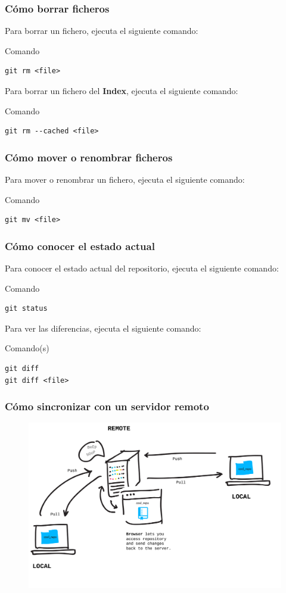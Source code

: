 \documentclass{beamer}
\begin{document}
\begin{frame}[fragile]
\frametitle{Cómo borrar ficheros}
Para borrar un fichero, ejecuta el siguiente comando:
\begin{block}{Comando}
\begin{verbatim}
git rm <file>
\end{verbatim}
\end{block}
\vskip 1.00cm
Para borrar un fichero del \textbf{Index}, ejecuta el siguiente comando:
\begin{block}{Comando}
\begin{verbatim}
git rm --cached <file>
\end{verbatim}
\end{block}
\end{frame}

\begin{frame}[fragile]
\frametitle{Cómo mover o renombrar ficheros}
Para mover o renombrar un fichero, ejecuta el siguiente comando:
\begin{block}{Comando}
\begin{verbatim}
git mv <file>
\end{verbatim}
\end{block}
\end{frame}

\begin{frame}[fragile]
\frametitle{Cómo conocer el estado actual}
Para conocer el estado actual del repositorio, ejecuta el siguiente comando:
\begin{block}{Comando}
\begin{verbatim}
git status
\end{verbatim}
\end{block}
\vskip 1.00cm
Para ver las diferencias, ejecuta el siguiente comando:
\begin{block}{Comando(s)}
\begin{verbatim}
git diff
git diff <file>
\end{verbatim}
\end{block}
\end{frame}

\begin{frame}
\frametitle{Cómo sincronizar con un servidor remoto}
\begin{figure}
\includegraphics[width=0.95\linewidth]{img/remote.png}
\end{figure}
\end{frame}
\end{document}
